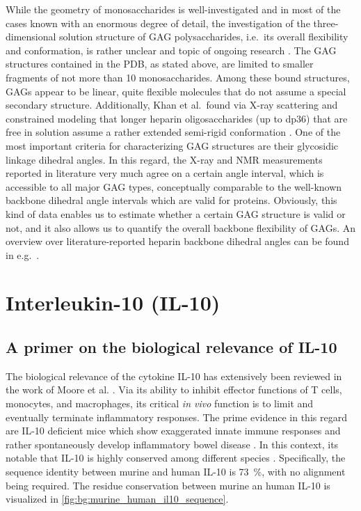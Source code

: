 While the geometry of monosaccharides is well-investigated and in most of the
cases known with an enormous degree of detail, the investigation of the
three-dimensional solution structure of GAG polysaccharides, i.e.\ its overall
flexibility and conformation, is rather unclear and topic of ongoing research
\cite{structure_gags_progess_perspectives_2010}. The GAG structures contained in
the PDB, as stated above, are limited to smaller fragments of not more than 10
monosaccharides. Among these bound structures, GAGs appear to be linear, quite
flexible molecules that do not assume a special secondary structure.
Additionally, Khan et al.\ found via X-ray scattering and constrained modeling
that longer heparin oligosaccharides (up to dp36) that are free in solution
assume a rather extended semi-rigid conformation
\cite{semi_rigid_heparin_structures_2010}. One of the most important criteria
for characterizing GAG structures are their glycosidic linkage dihedral angles.
In this regard, the X-ray and NMR measurements reported in literature very much
agree on a certain angle interval, which is accessible to all major GAG types,
conceptually comparable to the well-known backbone dihedral angle intervals
which are valid for proteins. Obviously, this kind of data enables us to
estimate whether a certain GAG structure is valid or not, and it also allows us
to quantify the overall backbone flexibility of GAGs. An overview over
literature-reported heparin backbone dihedral angles can be found in e.g.\
\cite{semi_rigid_heparin_structures_2010}.


\section{Interleukin-10 (IL-10)}

\subsection{A primer on the biological relevance of IL-10}

The biological relevance of the cytokine IL-10 has extensively been reviewed in
the work of Moore et al. \cite{moore_2001}. Via its ability to inhibit effector
functions of T cells, monocytes, and macrophages, its critical
\textit{in vivo} function is to limit and eventually terminate inflammatory
responses. The prime evidence in this regard are IL-10 deficient mice which show
exaggerated innate immune responses and rather spontaneously develop
inflammatory bowel disease \cite{mueller_il10defmouse_1993,
roers_il10_mice_2004,rubtsov_il10_mice_2008}. In this context, its notable that
IL-10 is highly conserved among different species \cite{il10_dna_rabiit_2000,
porcine_il10_1995}. Specifically, the sequence identity between murine and human
IL-10 is \SI{73}{\percent}, with no alignment being required. The residue
conservation between murine an human IL-10 is visualized in
\cref{fig:bg:murine_human_il10_sequence}.

